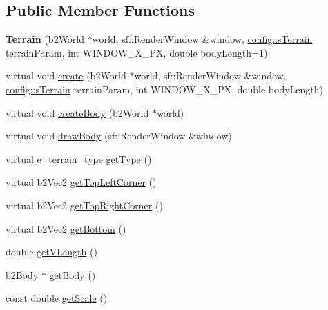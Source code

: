 \subsection*{Public Member Functions}
\begin{DoxyCompactItemize}
\item 
\mbox{\label{class_terrain_ae0f4cfd17060701ae6bf4e14e126ef5e}} 
{\bfseries Terrain} (b2\+World $\ast$world, sf\+::\+Render\+Window \&window, \mbox{\hyperlink{structconfig_1_1s_terrain}{config\+::s\+Terrain}} terrain\+Param, int W\+I\+N\+D\+O\+W\+\_\+\+X\+\_\+\+PX, double body\+Length=1)
\item 
virtual void \mbox{\hyperlink{class_terrain_ae7515dee9afa3b1cefac459abefb5442}{create}} (b2\+World $\ast$world, sf\+::\+Render\+Window \&window, \mbox{\hyperlink{structconfig_1_1s_terrain}{config\+::s\+Terrain}} terrain\+Param, int W\+I\+N\+D\+O\+W\+\_\+\+X\+\_\+\+PX, double body\+Length)
\item 
virtual void \mbox{\hyperlink{class_terrain_a97e007277f8abb9dde20ef2b49c38a3a}{create\+Body}} (b2\+World $\ast$world)
\item 
virtual void \mbox{\hyperlink{class_terrain_ae60571b91c1979fa94bdfc5002da6ac7}{draw\+Body}} (sf\+::\+Render\+Window \&window)
\item 
virtual \mbox{\hyperlink{_terrain_8h_a6d0b7e83bb7325270c1162bece970fd8}{e\+\_\+terrain\+\_\+type}} \mbox{\hyperlink{class_terrain_a6cd1220b8e64466cc7a2219efff4141b}{get\+Type}} ()
\item 
virtual b2\+Vec2 \mbox{\hyperlink{class_terrain_a8a8629396e5cb03961649acdc23eacf2}{get\+Top\+Left\+Corner}} ()
\item 
virtual b2\+Vec2 \mbox{\hyperlink{class_terrain_a10fcf414cba83e769d99156fe16aa795}{get\+Top\+Right\+Corner}} ()
\item 
virtual b2\+Vec2 \mbox{\hyperlink{class_terrain_a26e1c7c05b8256015730df34d97d29c2}{get\+Bottom}} ()
\item 
double \mbox{\hyperlink{class_terrain_a819253da1f67d199b6347b93071961e7}{get\+V\+Length}} ()
\item 
b2\+Body $\ast$ \mbox{\hyperlink{class_terrain_aa0e70c6bbd39935c69c2b6edb74fcd32}{get\+Body}} ()
\item 
const double \mbox{\hyperlink{class_terrain_af0cff27a194359a13c448c89bd374de3}{get\+Scale}} ()
\end{DoxyCompactItemize}

